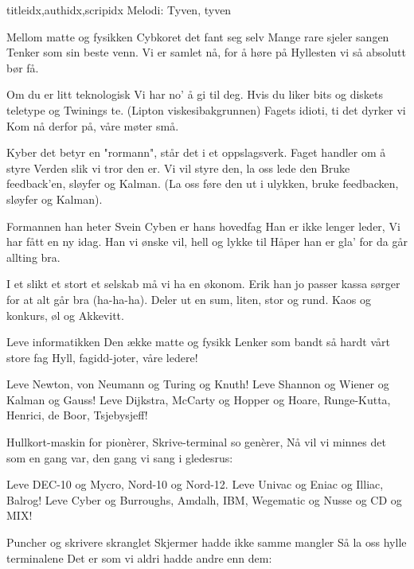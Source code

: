 \documentclass[14pt,letterpaper,norsk]{article}
\begin{document}
\begin{songs}{titleidx,authidx,scripidx}
{\footnotesize Melodi: Tyven, tyven}

\beginverse
Mellom matte og fysikken
Cybkoret det fant seg selv
Mange rare sjeler sangen 
Tenker som sin beste venn.
Vi er samlet nå, for å høre på 
Hyllesten vi så absolutt bør få.
\endverse

\beginverse
Om du er litt teknologisk
Vi har no' å gi til deg.
Hvis du liker bits og diskets
teletype og Twinings te.
(Lipton viskesibakgrunnen) 
Fagets idioti, ti det dyrker vi
Kom nå derfor på, våre møter små.
\endverse

\beginverse
Kyber det betyr en "rormann", 
står det i et oppslagsverk. 
Faget handler om å styre 
Verden slik vi tror den er. 
Vi vil styre den, la oss lede den 
Bruke feedback'en, sløyfer og Kalman. 
(La oss føre den ut i ulykken, 
bruke feedbacken, sløyfer og Kalman).
\endverse

\beginverse
Formannen han heter Svein 
Cyben er hans hovedfag 
Han er ikke lenger leder, 
Vi har fått en ny idag. 
Han vi ønske vil, hell og lykke til 
Håper han er gla' for da går allting bra.
\endverse

\beginverse
I et slikt et stort et selskab 
må vi ha en økonom. 
Erik han jo passer kassa 
sørger for at alt går bra (ha-ha-ha). 
Deler ut en sum, liten, stor og rund.
Kaos og konkurs, øl og Akkevitt.
\endverse
\endsong

\begin{intersong*}
\end{intersong*}

\beginverse
Leve informatikken
Den ække matte og fysikk
Lenker som bandt så hardt vårt store fag
Hyll, fagidd-joter, våre ledere!
\endverse

\beginchorus
Leve Newton, von Neumann og Turing og Knuth!
Leve Shannon og Wiener og Kalman og Gauss!
Leve Dijkstra, McCarty og Hopper og Hoare,
Runge-Kutta, Henrici, de Boor, Tsjebysjeff!
\endchorus

\beginverse
Hullkort-maskin for pionèrer,
Skrive-terminal so genèrer,
Nå vil vi minnes det som en gang var,
den gang vi sang i gledesrus:
\endverse

\beginchorus
Leve DEC-10 og Mycro, Nord-10 og Nord-12.
Leve Univac og Eniac og Illiac, Balrog!
Leve Cyber og Burroughs, Amdalh, IBM,
Wegematic og Nusse og CD og MIX!
\endchorus

\beginverse
Puncher og skrivere skranglet
Skjermer hadde ikke samme mangler
Så la oss hylle terminalene
Det er som vi aldri hadde andre enn dem:
\endverse


\end{songs}
\end{document}
